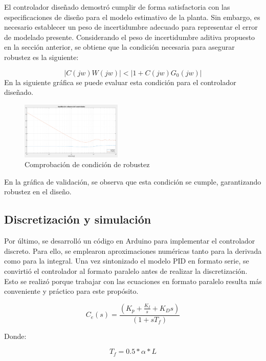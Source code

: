 \documentclass[letterpaper, 10 pt, conference]{ieeeconf}  %
\begin{document}
El controlador diseñado demostró cumplir de forma satisfactoria con las especificaciones de diseño para el modelo estimativo de la planta. Sin embargo, es necesario establecer un peso de incertidumbre adecuado para representar el error de modelado presente. Considerando el peso de incertidumbre aditiva propuesto en la sección anterior, se obtiene que la condición necesaria para asegurar robustez es la siguiente:

\begin{equation*}
  |C(jw)W(jw)| < |1 + C(jw)G_{0}(jw)|
\end{equation*}
En la siguiente gráfica se puede evaluar esta condición para el controlador diseñado.

\begin{figure}[htpb]
  \centering
  \includegraphics[width=0.43\textwidth]{./IMAGENES/pid6.png}
  \caption{Comprobación de condición de robustez}
  \label{fig:pid6}
\end{figure}

En la gráfica de validación, se observa que esta condición se cumple, garantizando robustez en el diseño.

\subsection{Discretización y simulación}

Por último, se desarrolló un código en Arduino para implementar el controlador discreto. Para ello, se emplearon aproximaciones numéricas tanto para la derivada como para la integral.
Una vez sintonizado el modelo PID en formato serie, se convirtió el controlador al formato paralelo antes de realizar la discretización. Esto se realizó porque trabajar con las ecuaciones en formato paralelo resulta más conveniente y práctico para este propósito.

\begin{equation*}
  C_{e}(s) = \frac{(K_p + \frac{K_I}{s} + K_{D}s)}{(1 + sT_{f})}
\end{equation*}

Donde:

\begin{equation*}
  T_{f} = 0.5 * \alpha * L
\end{equation*}
\end{document}
